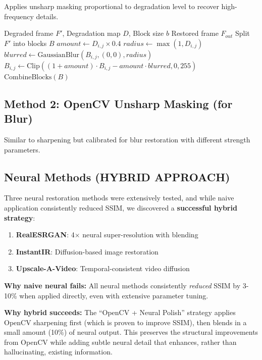 \documentclass[11pt,a4paper]{article}
\begin{document}
Applies unsharp masking proportional to degradation level to recover high-frequency details.

\begin{algorithm}[H]
\caption{OpenCV Sharpening Restoration}
\begin{algorithmic}[1]
\Require Degraded frame $F'$, Degradation map $D$, Block size $b$
\Ensure Restored frame $F_{out}$
\State Split $F'$ into blocks $B$
        \State $amount \gets D_{i,j} \times 0.4$
        \State $radius \gets \max(1, D_{i,j})$
        \State $blurred \gets \text{GaussianBlur}(B_{i,j}, (0,0), radius)$
        \State $B_{i,j} \gets \text{Clip}((1 + amount) \cdot B_{i,j} - amount \cdot blurred, 0, 255)$
    \EndIf
\EndFor
\State \Return $\text{CombineBlocks}(B)$
\end{algorithmic}
\end{algorithm}

\subsection{Method 2: OpenCV Unsharp Masking (for Blur)}

Similar to sharpening but calibrated for blur restoration with different strength parameters.

\subsection{Neural Methods (HYBRID APPROACH)}

Three neural restoration methods were extensively tested, and while naive application consistently reduced SSIM, we discovered a \textbf{successful hybrid strategy}:

\begin{enumerate}
    \item \textbf{RealESRGAN}: 4$\times$ neural super-resolution with blending
    \item \textbf{InstantIR}: Diffusion-based image restoration
    \item \textbf{Upscale-A-Video}: Temporal-consistent video diffusion
\end{enumerate}

\textbf{Why naive neural fails:} All neural methods consistently \emph{reduced} SSIM by 3-10\% when applied directly, even with extensive parameter tuning.

\textbf{Why hybrid succeeds:} The ``OpenCV + Neural Polish'' strategy applies OpenCV sharpening first (which is proven to improve SSIM), then blends in a small amount (10\%) of neural output. This preserves the structural improvements from OpenCV while adding subtle neural detail that enhances, rather than hallucinating, existing information.
\end{document}
